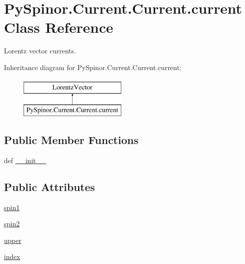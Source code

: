 \hypertarget{class_py_spinor_1_1_current_1_1_current_1_1current}{}\section{Py\+Spinor.\+Current.\+Current.\+current Class Reference}
\label{class_py_spinor_1_1_current_1_1_current_1_1current}


Lorentz vector currents.  


Inheritance diagram for Py\+Spinor.\+Current.\+Current.\+current\+:\begin{figure}[H]
\begin{center}
\leavevmode
\includegraphics[height=2.000000cm]{class_py_spinor_1_1_current_1_1_current_1_1current}
\end{center}
\end{figure}
\subsection*{Public Member Functions}
\begin{DoxyCompactItemize}
\item 
def \hyperlink{class_py_spinor_1_1_current_1_1_current_1_1current_ae3b366c2162861b95a9e153ea12e7dfa}{\+\_\+\+\_\+init\+\_\+\+\_\+}
\end{DoxyCompactItemize}
\subsection*{Public Attributes}
\begin{DoxyCompactItemize}
\item 
\hyperlink{class_py_spinor_1_1_current_1_1_current_1_1current_afb15d94b551fdbc5f8aeb7bf995202f4}{spin1}
\item 
\hyperlink{class_py_spinor_1_1_current_1_1_current_1_1current_a0bebca6b3a193936ea6f4feb0fca1fb2}{spin2}
\item 
\hyperlink{class_py_spinor_1_1_current_1_1_current_1_1current_a6c01b0e5a656cbd005b1612db36d6abb}{upper}
\item 
\hyperlink{class_py_spinor_1_1_current_1_1_current_1_1current_ab20a21fcc050dc05b3ec49c429a932e6}{index}
\end{DoxyCompactItemize}
